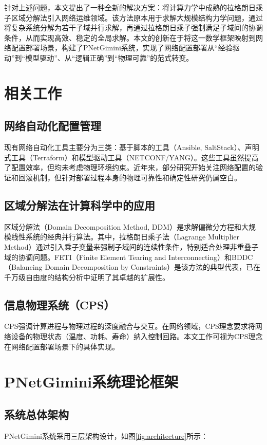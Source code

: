 \documentclass[12pt,a4paper]{article}
\begin{document}
针对上述问题，本文提出了一种全新的解决方案：将计算力学中成熟的拉格朗日乘子区域分解法引入网络运维领域。该方法原本用于求解大规模结构力学问题，通过将复杂系统分解为若干子域并行求解，再通过拉格朗日乘子强制满足子域间的协调条件，从而实现高效、稳定的全局求解。本文的创新在于将这一数学框架映射到网络配置部署场景，构建了PNetGimini系统，实现了网络配置部署从“经验驱动”到“模型驱动”、从“逻辑正确”到“物理可靠”的范式转变。

\section{相关工作}
\label{sec:related_work}

\subsection{网络自动化配置管理}
现有网络自动化工具主要分为三类：基于脚本的工具（Ansible, SaltStack）、声明式工具（Terraform）和模型驱动工具（NETCONF/YANG）。这些工具虽然提高了配置效率，但均未考虑物理环境约束。近年来，部分研究开始关注网络配置的验证和回滚机制，但针对部署过程本身的物理可靠性和确定性研究仍属空白。

\subsection{区域分解法在计算科学中的应用}
区域分解法（Domain Decomposition Method, DDM）是求解偏微分方程和大规模线性系统的经典并行算法。其中，拉格朗日乘子法（Lagrange Multiplier Method）通过引入乘子变量来强制子域间的连续性条件，特别适合处理非重叠子域的协调问题。FETI（Finite Element Tearing and Interconnecting）和BDDC（Balancing Domain Decomposition by Constraints）是该方法的典型代表，已在千万级自由度的结构分析中证明了其卓越的扩展性。

\subsection{信息物理系统（CPS）}
CPS强调计算进程与物理过程的深度融合与交互。在网络领域，CPS理念要求将网络设备的物理状态（温度、功耗、寿命）纳入控制回路。本文工作可视为CPS理念在网络配置部署场景下的具体实现。

\section{PNetGimini系统理论框架}
\label{sec:framework}

\subsection{系统总体架构}
PNetGimini系统采用三层架构设计，如图\ref{fig:architecture}所示：
 
\end{document}
